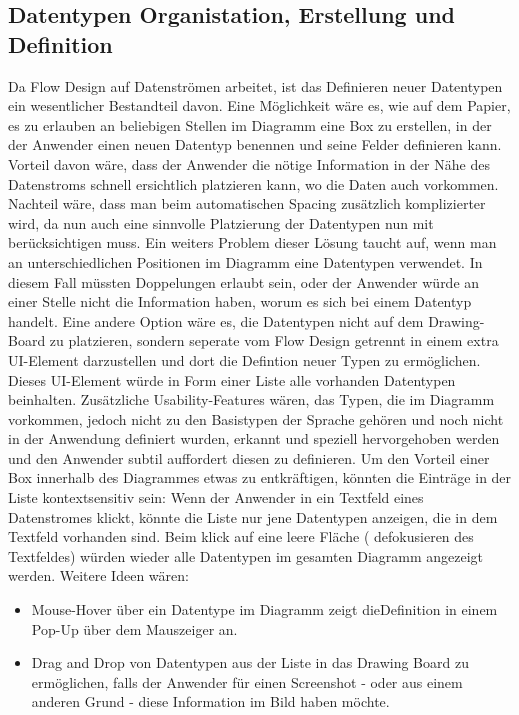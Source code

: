 \documentclass[11pt]{article}
\begin{document}
\subsection{Datentypen Organistation, Erstellung und Definition}
\label{sec:orgheadline24}
Da Flow Design auf Datenströmen arbeitet, ist das Definieren neuer Datentypen
ein wesentlicher Bestandteil davon.
Eine Möglichkeit wäre es, wie auf dem Papier, es zu erlauben an beliebigen
Stellen im Diagramm eine Box zu erstellen, in der der Anwender einen neuen
Datentyp benennen und seine Felder definieren kann. Vorteil davon wäre, dass der
Anwender die nötige Information in der Nähe des Datenstroms schnell ersichtlich
platzieren kann, wo die Daten auch vorkommen.
Nachteil wäre, dass man beim automatischen Spacing zusätzlich komplizierter
wird, da nun auch eine sinnvolle Platzierung der Datentypen nun mit
berücksichtigen muss.
Ein weiters Problem dieser Lösung taucht auf, wenn man an unterschiedlichen
Positionen im Diagramm eine Datentypen verwendet. In diesem Fall müssten Doppelungen erlaubt
sein, oder der Anwender würde an einer Stelle nicht die Information haben, worum
es sich bei einem Datentyp handelt.
Eine andere Option wäre es, die Datentypen nicht auf dem Drawing-Board zu
platzieren, sondern seperate vom Flow Design getrennt in einem extra UI-Element
darzustellen und dort die Defintion neuer Typen zu ermöglichen.
Dieses UI-Element würde in Form einer Liste alle vorhanden Datentypen
beinhalten. Zusätzliche Usability-Features wären, das Typen, die im Diagramm
vorkommen, jedoch nicht zu den Basistypen der Sprache gehören und noch nicht in
der Anwendung definiert wurden, erkannt und speziell hervorgehoben werden und
den Anwender subtil auffordert diesen zu definieren.
Um den Vorteil einer Box innerhalb des Diagrammes etwas zu entkräftigen, könnten
die Einträge in der Liste kontextsensitiv sein: Wenn der Anwender in ein
Textfeld eines Datenstromes klickt, könnte die Liste nur jene Datentypen
anzeigen, die in dem Textfeld vorhanden sind. Beim klick auf eine leere Fläche (
defokusieren des Textfeldes) würden wieder alle Datentypen im gesamten Diagramm
angezeigt werden.
Weitere Ideen wären: 
\begin{itemize}
\item Mouse-Hover über ein Datentype im Diagramm zeigt dieDefinition in einem Pop-Up
über dem Mauszeiger an.
\item Drag and Drop von Datentypen aus der Liste in das Drawing Board zu
ermöglichen, falls der Anwender für einen Screenshot - oder aus einem anderen
Grund - diese Information im Bild haben möchte.
\end{itemize}
\end{document}
